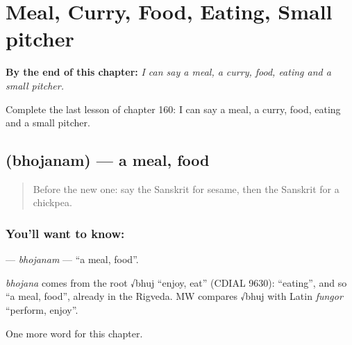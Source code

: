 
\chapter{Meal, Curry, Food, Eating, Small pitcher}
\label{ch:sa-meal-curry-food-eating-small-pitcher}

\begin{chapteropening}
\textbf{By the end of this chapter:} \emph{I can say a meal, a curry, food, eating and a small pitcher.}

Complete the last lesson of chapter 160: I can say a meal, a curry, food, eating and a small pitcher.
\end{chapteropening}

\section[\texorpdfstring{\sk{भोजनम्} (bhojanam)}{भोजनम् (bhojanam)}]{ (bhojanam) — a meal, food}

\label{lesson:SA-C160-bhojanam}



\begin{quote}
Before the new one: say the Sanskrit for sesame, then the Sanskrit for a chickpea.
\end{quote}

\subsection*{You'll want to know: }
\textbf{} — \emph{bhojanam} — \textquotedblleft{}a meal, food\textquotedblright{}.

\begin{cousinweb}
\emph{bhojana} comes from the root √bhuj \textquotedblleft{}enjoy, eat\textquotedblright{} (CDIAL 9630): \textquotedblleft{}eating\textquotedblright{}, and so \textquotedblleft{}a meal, food\textquotedblright{}, already in the Rigveda. MW compares √bhuj with Latin \emph{fungor} \textquotedblleft{}perform, enjoy\textquotedblright{}.
\end{cousinweb}

\begin{grammarlens}[title={What you've built}]
One more word for this chapter.
\end{grammarlens}

